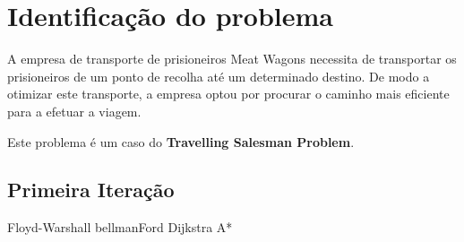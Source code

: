 \documentclass[article, a4paper, 12pt, oneside]{memoir}
\begin{document}
\section{Identificação do problema}

A empresa de transporte de prisioneiros Meat Wagons necessita de transportar os prisioneiros  de um ponto de recolha até um determinado destino. De modo a otimizar este transporte, a empresa optou por procurar o caminho mais eficiente para a efetuar a viagem. 

Este problema é um caso do \textbf{Travelling Salesman Problem}.

\subsection{Primeira Iteração}


Floyd-Warshall
bellmanFord
Dijkstra
A*
\end{document}
